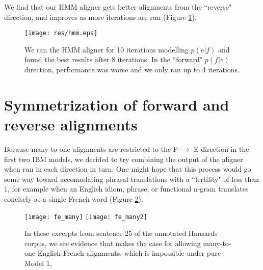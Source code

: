 \documentclass{article}
\begin{document}
We find that our HMM aligner gets better alignments from the ``reverse" direction, and improves as more iterations are run (Figure \ref{fig:hmm_learning_curve}).

\begin{figure}[ht]
\begin{center}
    \texttt{[image: res/hmm.eps]}
\end{center}
\caption{
    We ran the HMM aligner for 10 iterations modelling $p(e|f)$ and found the best results after 8 iterations. In the ``forward" $p(f|e)$ direction, performance was worse and we only ran up to 4 iterations.
}
\label{fig:hmm_learning_curve}
\end{figure}

\section{Symmetrization of forward and reverse alignments}

Because many-to-one alignments are restricted to the F $\rightarrow$ E direction in the first two IBM models, we decided to try combining the output of the aligner when run in each direction in turn. One might hope that this process would go some way toward accomodating phrasal translations with a ``fertility" of less than 1, for example when an English idiom, phrase, or functional n-gram translates concisely as a single French word (Figure \ref{fig:etof}).

\begin{figure}[h]
\begin{center}
    \texttt{[image: fe\_many]}
    \texttt{[image: fe\_many2]}
\caption{
    In these excerpts from sentence 25 of the annotated Hansards corpus, we see evidence that makes the case for allowing many-to-one English-French alignments, which is impossible under pure Model 1.
}
\label{fig:etof}
\end{center}
\end{figure}
\end{document}
